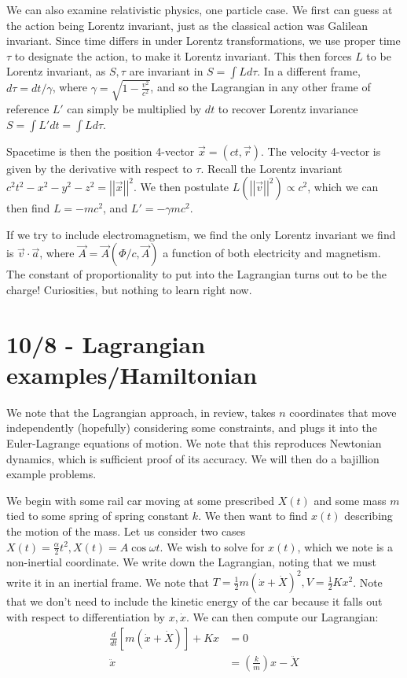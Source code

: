 \documentclass[10pt]{report}
\newcommand{\rd}[2]{\frac{d#1}{d#2}}
\newcommand{\norm}[1]{\left|\left|#1\right|\right|}
\begin{document}
We can also examine relativistic physics, one particle case. We first can guess at the action being Lorentz invariant, just as the classical action was Galilean invariant. Since time differs in under Lorentz transformations, we use proper time $\tau$ to designate the action, to make it Lorentz invariant. This then forces $L$ to be Lorentz invariant, as $S,\tau$ are invariant in $S = \int L d\tau$. In a different frame, $d\tau = dt/\gamma$, where $\gamma =\sqrt{1-\frac{v^2}{c^2}}$, and so the Lagrangian in any other frame of reference $L'$ can simply be multiplied by $dt$ to recover Lorentz invariance $S=\int L'dt = \int L d\tau$.

Spacetime is then the position 4-vector $\vec{x} = (ct,\vec{r})$. The velocity 4-vector is given by the derivative with respect to $\tau$. Recall the Lorentz invariant $c^2t^2 - x^2 - y^2 - z^2 = \norm{\vec{x}}^2$. We then postulate $L(\norm{\vec{v}}^2) \propto c^2$, which we can then find $L = -mc^2$, and $L'=-\gamma mc^2$. 

If we try to include electromagnetism, we find the only Lorentz invariant we find is $\vec{v}\cdot\vec{a}$, where $\vec{A} = \vec{A}(\Phi/c,\vec{A})$ a function of both electricity and magnetism. The constant of proportionality to put into the Lagrangian turns out to be the charge! Curiosities, but nothing to learn right now. 

\chapter{10/8 - Lagrangian examples/Hamiltonian}

We note that the Lagrangian approach, in review, takes $n$ coordinates that move independently (hopefully) considering some constraints, and plugs it into the Euler-Lagrange equations of motion. We note that this reproduces Newtonian dynamics, which is sufficient proof of its accuracy. We will then do a bajillion example problems.

We begin with some rail car moving at some prescribed $X(t)$ and some mass $m$ tied to some spring of spring constant $k$. We then want to find $x(t)$ describing the motion of the mass. Let us consider two cases $X(t) = \frac{\alpha}{2}t^2, X(t)=A\cos\omega t$. We wish to solve for $x(t)$, which we note is a non-inertial coordinate. We write down the Lagrangian, noting that we must write it in an inertial frame. We note that $T=\frac{1}{2}m\left( \dot{x}+\dot{X} \right)^2, V=\frac{1}{2}Kx^2$. Note that we don't need to include the kinetic energy of the car because it falls out with respect to differentiation by $x,\dot{x}$. We can then compute our Lagrangian:
\begin{align*}
    \rd{}{t}\left[ m\left( \dot{x}+\dot{X} \right) \right] + Kx &= 0\\
    \ddot{x} &= \left( \frac{k}{m} \right)x -\ddot{X}
\end{align*}
\end{document}
